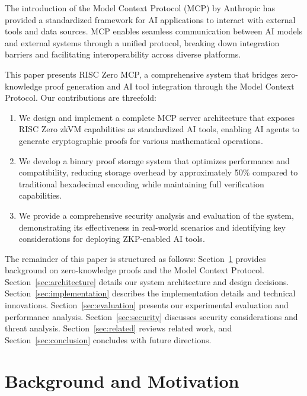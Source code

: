 \documentclass[11pt]{article}
\begin{document}
The introduction of the Model Context Protocol (MCP) by Anthropic has provided a standardized framework for AI applications to interact with external tools and data sources. MCP enables seamless communication between AI models and external systems through a unified protocol, breaking down integration barriers and facilitating interoperability across diverse platforms.

This paper presents RISC Zero MCP, a comprehensive system that bridges zero-knowledge proof generation and AI tool integration through the Model Context Protocol. Our contributions are threefold:

\begin{enumerate}
\item We design and implement a complete MCP server architecture that exposes RISC Zero zkVM capabilities as standardized AI tools, enabling AI agents to generate cryptographic proofs for various mathematical operations.

\item We develop a binary proof storage system that optimizes performance and compatibility, reducing storage overhead by approximately 50\% compared to traditional hexadecimal encoding while maintaining full verification capabilities.

\item We provide a comprehensive security analysis and evaluation of the system, demonstrating its effectiveness in real-world scenarios and identifying key considerations for deploying ZKP-enabled AI tools.
\end{enumerate}

The remainder of this paper is structured as follows: Section~\ref{sec:background} provides background on zero-knowledge proofs and the Model Context Protocol. Section~\ref{sec:architecture} details our system architecture and design decisions. Section~\ref{sec:implementation} describes the implementation details and technical innovations. Section~\ref{sec:evaluation} presents our experimental evaluation and performance analysis. Section~\ref{sec:security} discusses security considerations and threat analysis. Section~\ref{sec:related} reviews related work, and Section~\ref{sec:conclusion} concludes with future directions.

\section{Background and Motivation}
\label{sec:background}
\end{document}
